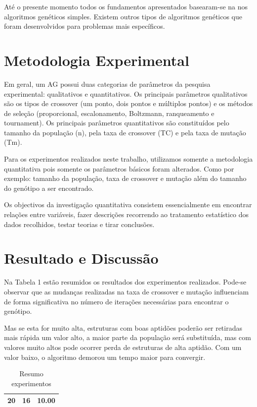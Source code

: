 \documentclass[conference]{IEEEtran}
\begin{document}
    Até o presente momento todos os fundamentos apresentados basearam-se na nos algoritmos genéticos simples. Existem outros tipos de algoritmos genéticos que foram desenvolvidos para problemas mais específicos.
    
\section{Metodologia Experimental}

Em geral, um AG possui duas categorias de parâmetros da pesquisa experimental: qualitativos e quantitativos. Os principais parâmetros qualitativos são os tipos de crossover (um ponto, dois pontos e múltiplos pontos) e os métodos de seleção (proporcional, escalonamento, Boltzmann, ranqueamento e tournament). Os principais parâmetros quantitativos são constituídos pelo tamanho da população (n), pela taxa de crossover (TC) e pela taxa de mutação (Tm). 

Para os experimentos realizados neste trabalho, utilizamos somente a metodologia quantitativa pois somente os parâmetros básicos foram alterados. Como por exemplo: tamanho da população, taxa de crossover e mutação além do tamanho do genótipo a ser encontrado.

Os objectivos da investigação quantitativa consistem essencialmente em encontrar relações entre variáveis, fazer descrições recorrendo ao tratamento estatístico dos dados recolhidos, testar teorias e tirar conclusões.

\section{Resultado e Discussão}

Na Tabela 1 estão resumidos os resultados dos experimentos realizados. Pode-se observar que as mudanças realizadas na taxa de crossover e mutação influenciam de forma significativa no número de iterações necessárias para encontrar o genótipo.  

Mas se esta for muito alta, estruturas com boas aptidões poderão ser retiradas mais rápida um valor alto, a maior parte da população será substituída, mas com valores muito altos pode ocorrer perda de estruturas de alta aptidão. Com um valor baixo, o algoritmo demorou um tempo maior para convergir.

    \begin {table}
    \caption {Resumo experimentos}
    \begin{center}
      \begin{tabular}{ l | c | r }
        \hline

        20&	16&	10.00 \\
        \hline
      \end{tabular}
      \end{center}
    \end{table}
\end{document}
